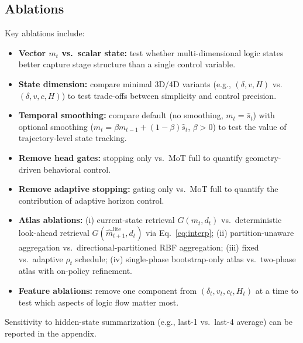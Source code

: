 \documentclass{article}
\begin{document}
\subsection{Ablations}
Key ablations include:
\begin{itemize}[leftmargin=1.3em, itemsep=0.2em]
    \item \textbf{Vector $m_t$ vs.\ scalar state:} test whether multi-dimensional logic states better capture stage structure than a single control variable.
    \item \textbf{State dimension:} compare minimal 3D/4D variants (e.g., $(\delta,v,H)$ vs.\ $(\delta,v,c,H)$) to test trade-offs between simplicity and control precision.
    \item \textbf{Temporal smoothing:} compare default (no smoothing, $m_t = \hat s_t$) with optional smoothing ($m_t = \beta m_{t-1} + (1-\beta)\hat s_t$, $\beta>0$) to test the value of trajectory-level state tracking.
    \item \textbf{Remove head gates:} stopping only vs.\ MoT full to quantify geometry-driven behavioral control.
    \item \textbf{Remove adaptive stopping:} gating only vs.\ MoT full to quantify the contribution of adaptive horizon control.
    \item \textbf{Atlas ablations:} (i) current-state retrieval $G(m_t,d_t)$ vs.\ deterministic look-ahead retrieval $G(\hat m^{\mathrm{lite}}_{t+1},d_t)$ via Eq.~\eqref{eq:interp}; (ii) partition-unaware aggregation vs.\ directional-partitioned RBF aggregation; (iii) fixed vs.\ adaptive $\rho_t$ schedule; (iv) single-phase bootstrap-only atlas vs.\ two-phase atlas with on-policy refinement.
    \item \textbf{Feature ablations:} remove one component from $(\delta_t, v_t, c_t, H_t)$ at a time to test which aspects of logic flow matter most.
\end{itemize}
Sensitivity to hidden-state summarization (e.g., last-1 vs.\ last-4 average) can be reported in the appendix.
\end{document}
